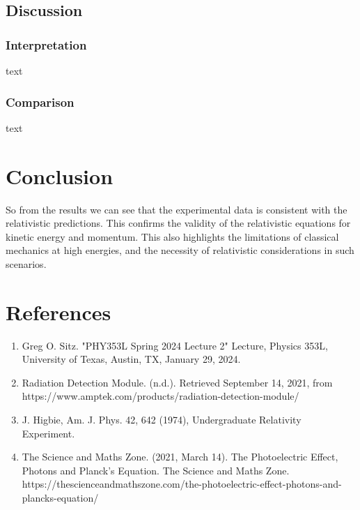 \documentclass[12pt]{article}
\begin{document}
                        
        \subsection{Discussion}
                \subsubsection{Interpretation}
                text
                \subsubsection{Comparison}
                text

\vfill


\section{Conclusion}
        So from the results we can see that the experimental data is consistent with the relativistic predictions. This confirms the validity of the relativistic equations for kinetic energy and momentum. This also highlights the limitations of classical mechanics at high energies, and the necessity of relativistic considerations in such scenarios.


\section{References}
    \begin{enumerate}
        \sloppy

        \item Greg O. Sitz. "PHY353L Spring 2024 Lecture 2" Lecture, Physics 353L, University of Texas, Austin, TX, January 29, 2024.
        \item Radiation Detection Module. (n.d.). Retrieved September 14, 2021, from https://www.amptek.com/products/radiation-detection-module/
        \item J. Higbie, Am. J. Phys. 42, 642 (1974), Undergraduate Relativity Experiment.
        \item The Science and Maths Zone. (2021, March 14). The Photoelectric Effect, Photons and Planck’s Equation. The Science and Maths Zone. https://thescienceandmathszone.com/the-photoelectric-effect-photons-and-plancks-equation/

    \end{enumerate}
\end{document}
